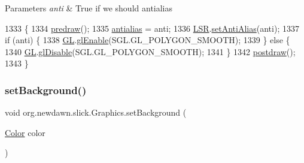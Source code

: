 \begin{DoxyParams}{Parameters}
{\em anti} & True if we should antialias \\
\hline
\end{DoxyParams}

\begin{DoxyCode}
1333                                            \{
1334         \mbox{\hyperlink{classorg_1_1newdawn_1_1slick_1_1_graphics_a7b4c203181e3b6302d51ed9b24596b8d}{predraw}}();
1335         \mbox{\hyperlink{classorg_1_1newdawn_1_1slick_1_1_graphics_a8ad14a02fea22933d2fc5b737433066a}{antialias}} = anti;
1336         \mbox{\hyperlink{classorg_1_1newdawn_1_1slick_1_1_graphics_a56cf9873aa4a26e824f6cd4232fdb3f0}{LSR}}.\mbox{\hyperlink{interfaceorg_1_1newdawn_1_1slick_1_1opengl_1_1renderer_1_1_line_strip_renderer_a849fde4a1b5b6981e77978bb3afa2b3b}{setAntiAlias}}(anti);
1337         \textcolor{keywordflow}{if} (anti) \{
1338             \mbox{\hyperlink{classorg_1_1newdawn_1_1slick_1_1_graphics_a39ca68db81b225982a4421c4a6835eed}{GL}}.\mbox{\hyperlink{interfaceorg_1_1newdawn_1_1slick_1_1opengl_1_1renderer_1_1_s_g_l_a35991f93081980b303d6ccc5bd88c8da}{glEnable}}(SGL.GL\_POLYGON\_SMOOTH);
1339         \} \textcolor{keywordflow}{else} \{
1340             \mbox{\hyperlink{classorg_1_1newdawn_1_1slick_1_1_graphics_a39ca68db81b225982a4421c4a6835eed}{GL}}.\mbox{\hyperlink{interfaceorg_1_1newdawn_1_1slick_1_1opengl_1_1renderer_1_1_s_g_l_a3b47b402f84bc1404e6b218264981bb5}{glDisable}}(SGL.GL\_POLYGON\_SMOOTH);
1341         \}
1342         \mbox{\hyperlink{classorg_1_1newdawn_1_1slick_1_1_graphics_abe054371d1486618ff327bbbcf02ff97}{postdraw}}();
1343     \}
\end{DoxyCode}
\mbox{\label{classorg_1_1newdawn_1_1slick_1_1_graphics_a792bcb1d729c35041b99b9eb2211649a}} 
\subsubsection{\texorpdfstring{set\+Background()}{setBackground()}}
{\footnotesize\ttfamily void org.\+newdawn.\+slick.\+Graphics.\+set\+Background (\begin{DoxyParamCaption}\item[{\mbox{\hyperlink{classorg_1_1newdawn_1_1slick_1_1_color}{Color}}}]{color }\end{DoxyParamCaption})\hspace{0.3cm}{\ttfamily [inline]}}

